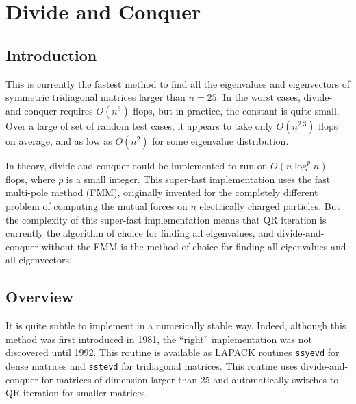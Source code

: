 \documentclass{article}
\begin{document}
\maketitle
\thispagestyle{firstpage} 

\section{Divide and Conquer}
\label{sec:divide-conquer}
\subsection{Introduction}
This is currently the fastest method to find all the eigenvalues and
eigenvectors of symmetric tridiagonal matrices larger than $n = 25$.
In the worst cases, divide-and-conquer requires $O(n^3)$ flops, but in
practice, the constant is quite small. 
Over a large of set of random test cases, it appears to take only
$O(n^{2.3})$ flops on average, and as low as $O(n^2)$ for some eigenvalue
distribution.

In theory, divide-and-conquer could be implemented to run on $O(n\log^pn)$
flops, where $p$ is a small integer. This super-fast implementation uses
the fast multi-pole method (FMM), originally invented for the completely
different problem of computing the mutual forces on $n$ electrically
charged particles.
But the complexity of this super-fast implementation means that QR
iteration is currently the algorithm of choice for finding all eigenvalues,
and divide-and-conquer without the FMM is the method of choice for finding
all eigenvalues and all eigenvectors.

\subsection{Overview}
It is quite subtle to implement in a numerically stable way. Indeed,
although this method was first introduced in 1981, the ``right''
implementation was not discovered until 1992.  This routine is available as
LAPACK routines \texttt{ssyevd} for dense matrices and \texttt{sstevd} for
tridiagonal matrices.  This routine uses divide-and-conquer for matrices of
dimension larger than 25 and automatically switches to QR iteration for
smaller matrices.
\end{document}
